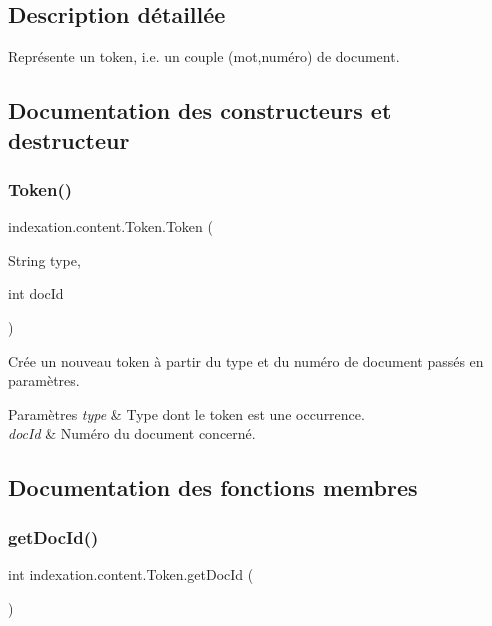 \subsection{Description détaillée}
Représente un token, i.\+e. un couple (mot,numéro) de document. 

\subsection{Documentation des constructeurs et destructeur}
\mbox{\label{classindexation_1_1content_1_1Token_a076e80bfca62758aa3245cc894db81c0}} 
\subsubsection{\texorpdfstring{Token()}{Token()}}
{\footnotesize\ttfamily indexation.\+content.\+Token.\+Token (\begin{DoxyParamCaption}\item[{String}]{type,  }\item[{int}]{doc\+Id }\end{DoxyParamCaption})}

Crée un nouveau token à partir du type et du numéro de document passés en paramètres.


\begin{DoxyParams}{Paramètres}
{\em type} & Type dont le token est une occurrence. \\
\hline
{\em doc\+Id} & Numéro du document concerné. \\
\hline
\end{DoxyParams}


\subsection{Documentation des fonctions membres}
\mbox{\label{classindexation_1_1content_1_1Token_a5fa3c07cbb4eccb95bcd600a183c098e}} 
\subsubsection{\texorpdfstring{get\+Doc\+Id()}{getDocId()}}
{\footnotesize\ttfamily int indexation.\+content.\+Token.\+get\+Doc\+Id (\begin{DoxyParamCaption}{ }\end{DoxyParamCaption})}

